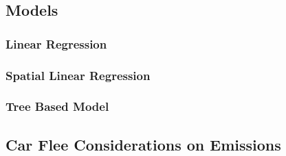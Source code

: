 \subsection{Models}
\subsubsection{Linear Regression}

\subsubsection{Spatial Linear Regression }
\subsubsection{Tree Based Model}
\subsection{Car Flee Considerations on Emissions}













